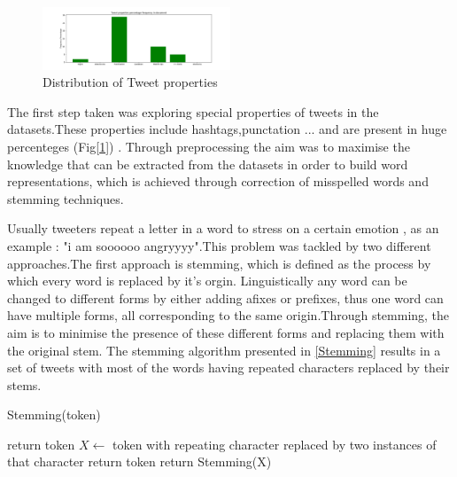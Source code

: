 \documentclass[10pt,conference,compsocconf]{IEEEtran}
\begin{document}
\begin{figure}[!htb]
	\centering \includegraphics[width=0.5\textwidth]{../plots/types.png}
	\caption{Distribution of Tweet properties}
	\label{prop}
\end{figure}

The first step taken was exploring special properties of tweets in the datasets.These properties include hashtags,punctation ... and are present in huge percenteges (Fig[\ref{prop}]) . Through preprocessing the aim was to maximise the knowledge that can be extracted from the datasets in order to build word representations, which is achieved through correction of misspelled words and stemming techniques.

Usually tweeters repeat a letter in a word to stress on a certain emotion , as an example : "i am soooooo angryyyy".This problem was tackled by two different approaches.The first approach is stemming, which is defined as the process by which every word is replaced by it's orgin. Linguistically any word can be changed to different forms by either adding afixes or prefixes, thus one word can have multiple forms, all corresponding to the same origin.Through stemming, the aim is to minimise the presence of these different forms and replacing them with the original stem. The stemming algorithm presented in \ref{Stemming} results in a set of tweets with most of the words having repeated characters replaced by their stems.

\begin{algorithm}
\caption{Stemming(token)}
\label{Stemming}
\begin{algorithmic} 
\STATE return token
\ELSE
\STATE $X \leftarrow $ token with repeating character replaced by two instances of that character
\STATE return token
\ELSE
\STATE return Stemming(X)
\ENDIF
\ENDIF
\end{algorithmic}
\end{algorithm}
\end{document}
